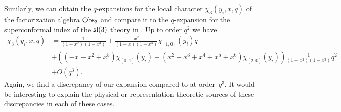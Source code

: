 Similarly, we can obtain the $q$-expansions for the local character $\chi_3(y_i,x,q)$ of the factorization algebra $\operatorname{Obs}_3$ and compare it to the $q$-expansion for the superconformal index of the $\mathfrak{sl}(3)$ theory in \cite{Imamura}. 
Up to order $q^2$ we have
\begin{align*}
\chi_3(y_i,x,q) & = \frac{1}{(1-x^2)(1-x^3)} + \frac{x^2}{(1-x)(1-x^3)} \chi_{[1,0]}(y_i) q \\
& + \left((-x -x^2 + x^5)\chi_{[0,1]}(y_i) + (x^2 + x^3 + x^4 + x^5+ x^6) \chi_{[2,0]}(y_i) \right) \frac{1}{(1-x^2)(1-x^3)} q^2 \\
& + O(q^3) .
\end{align*}
Again, we find a discrepancy of our expansion compared to \cite{Imamura} at order~$q^3$.
It would be interesting to explain the physical or representation theoretic sources of these discrepancies in each of these cases.

